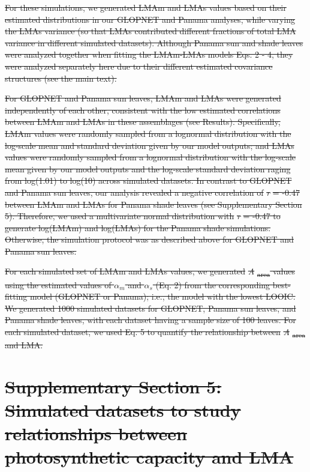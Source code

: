 \documentclass[
  12pt,
  letterpaper,
  DIV=11,
  numbers=noendperiod]{scrartcl}
\numberwithin{equation}{section} %
\providecommand{\DIFdel}[1]{{\protect\color{red}\sout{#1}}}                      %
\begin{document}
\DIFdel{For these simulations, we generated LMAm and LMAs values based on their
estimated distributions in our GLOPNET and Panama analyses, while
varying the LMAs variance (so that LMAs contributed different fractions
of total LMA variance in different simulated datasets). Although Panama
sun and shade leaves were analyzed together when fitting the LMAm-LMAs
models Eqs. 2 - 4, they were analyzed separately here due to their
different estimated covariance structures (see the main text).
}%

\DIFdel{For GLOPNET and Panama sun leaves, LMAm and LMAs were generated
independently of each other, consistent with the low estimated
correlations between LMAm and LMAs in these assemblages (see Results).
Specifically, LMAm values were randomly sampled from a lognormal
distribution with the log-scale mean and standard deviation given by our
model outputs; and LMAs values were randomly sampled from a lognormal
distribution with the log-scale mean given by our model outputs and the
log-scale standard deviation raging from log(1.01) to log(10) across
simulated datasets. In contrast to GLOPNET and Panama sun leaves, our
analysis revealed a negative correlation of }\emph{\DIFdel{r}} %
\DIFdel{= -0.47 between
LMAm and LMAs for Panama shade leaves (see Supplementary Section 5).
Therefore, we used a multivariate normal distribution with }\emph{\DIFdel{r}} %
\DIFdel{=
-0.47 to generate log(LMAm) and log(LMAs) for the Panama shade
simulations. Otherwise, the simulation protocol was as described above
for GLOPNET and Panama sun leaves.
}%

\DIFdel{For each simulated set of LMAm and LMAs values, we generated
}\emph{\DIFdel{A}}%
\DIFdel{\textsubscript{area} values using the estimated values of
\(\alpha_m\) and \(\alpha_s\) (Eq. 2) from the corresponding
best-fitting model (GLOPNET or Panama); i.e., the model with the lowest
LOOIC. We generated 1000 simulated datasets for GLOPNET, Panama sun
leaves, and Panama shade leaves, with each dataset having a sample size
of 100 leaves. For each simulated dataset, we used Eq. 5 to quantify the
relationship between }\emph{\DIFdel{A}}%
\DIFdel{\textsubscript{area} and LMA.
}%

\section{\DIFdel{Supplementary Section 5: Simulated datasets to study
relationships between photosynthetic capacity and
LMA}}%
\addtocounter{section}{-1}%
\end{document}
